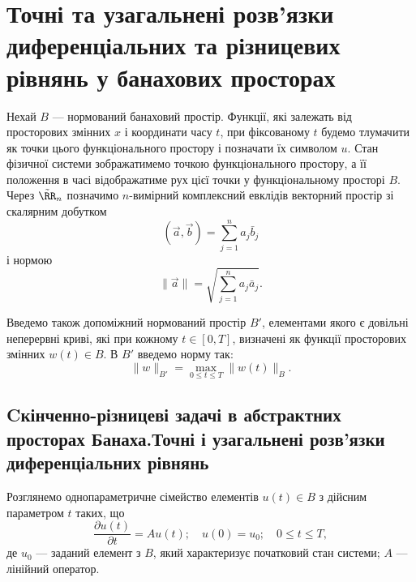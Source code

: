\section{Точні та узагальнені розв'язки диференціальних та різницевих рівнянь у банахових просторах}


Нехай $B$ --- нормований банаховий простір. Функції, які залежать від просторових змінних $x$ і координати часу $t$, при фіксованому $t$ будемо тлумачити як точки цього функціонального простору і позначати їх символом $u$. Стан фізичної системи зображатимемо точкою функціонального простору, а її положення в часі відображатиме рух цієї точки у функціональному просторі $B$. Через $\tilde{\RR}_n$  позначимо $n$-вимірний комплексний евклідів векторний простір зі скалярним добутком
\begin{equation*}
    \left(\vec a, \vec b\right) = \sum_{j = 1}^n a_j \bar b_j
\end{equation*}
і нормою
\begin{equation*}
    \|\vec a\| = \sqrt{\sum_{j = 1}^n a_j \bar a_j}.
\end{equation*}

Введемо також допоміжний нормований простір $B'$, елементами якого є довільні неперервні криві, які при кожному $t \in [0, T]$, визначені як функції просторових змінних $w(t) \in B$. В $B'$ введемо норму так:
\begin{equation*}
    \|w\|_{B'} = \max_{0 \le t \le T} \|w(t)\|_B.
\end{equation*}

\subsection{Cкінченно-різницеві задачі в абстрактних просторах Банаха.Точні і узагальнені розв'язки диференціальних рівнянь}

Розглянемо однопараметричне сімейство елементів $u(t) \in B$ з дійсним параметром $t$ таких, що 
\begin{equation}
    \label{eq:3.1}
    \frac{\partial u(t)}{\partial t} = A u(t); \quad u(0) = u_0; \quad 0 \le t \le T,
\end{equation}
де $u_0$ --- заданий елемент з $B$, який характеризує початковий стан системи; $A$ --- лінійний оператор. \medskip

